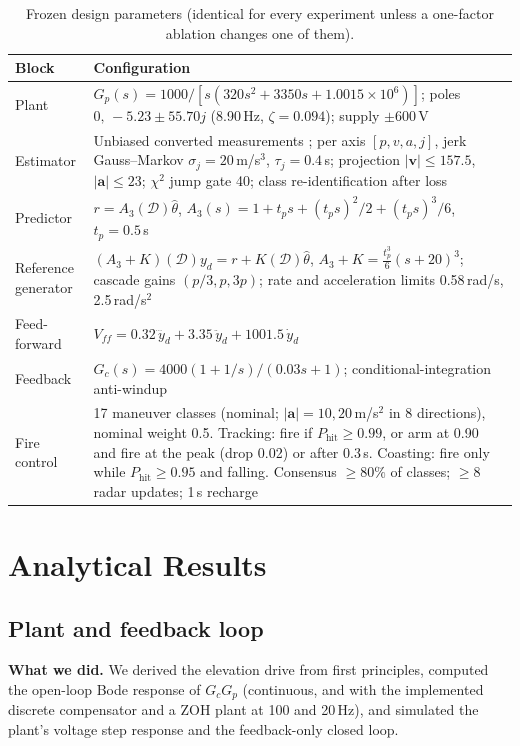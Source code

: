 \documentclass[11pt,a4paper]{article}
\newcommand{\Phit}{P_{\mathrm{hit}}}
\newcommand{\D}{\mathcal{D}}
\begin{document}
\begin{table}[H]
\centering\small
\caption{Frozen design parameters (identical for every experiment unless a one-factor ablation changes one of them).}
\label{tab:params}
\begin{tabularx}{\textwidth}{@{}lX@{}}
\toprule
Block & Configuration\\
\midrule
Plant & $G_p(s)=1000/[s(320s^2+3350s+1.0015\times10^6)]$; poles $0,\,-5.23\pm55.70j$ (8.90\,Hz, $\zeta=0.094$); supply $\pm600$\,V\\
Estimator & Unbiased converted measurements \cite{mo1998unbiased,lerro1993}; per axis $[p,v,a,j]$, jerk Gauss--Markov \cite{mehrotra1997jerk} $\sigma_j=20$\,m/s$^3$, $\tau_j=0.4$\,s; projection $|\mathbf v|\le157.5$, $|\mathbf a|\le23$; $\chi^2$ jump gate 40; class re-identification after loss\\
Predictor & $r=A_3(\D)\hat\theta$, $A_3(s)=1+t_ps+(t_ps)^2/2+(t_ps)^3/6$, $t_p=0.5$\,s\\
Reference generator & $(A_3+K)(\D)y_d=r+K(\D)\hat\theta$, $A_3+K=\tfrac{t_p^3}{6}(s+20)^3$; cascade gains $(p/3,p,3p)$; rate and acceleration limits 0.58\,rad/s, 2.5\,rad/s$^2$\\
Feed-forward & $V_{ff}=0.32\,\dddot y_d+3.35\,\ddot y_d+1001.5\,\dot y_d$\\
Feedback & $G_c(s)=4000(1+1/s)/(0.03s+1)$; conditional-integration anti-windup\\
Fire control & 17 maneuver classes (nominal; $|\mathbf a|=10, 20$\,m/s$^2$ in 8 directions), nominal weight 0.5. Tracking: fire if $\Phit\ge0.99$, or arm at 0.90 and fire at the peak (drop 0.02) or after 0.3\,s. Coasting: fire only while $\Phit\ge0.95$ and falling. Consensus $\ge80\%$ of classes; $\ge8$ radar updates; 1\,s recharge\\
\bottomrule
\end{tabularx}
\end{table}

\section{Analytical Results}

\subsection{Plant and feedback loop}
\textbf{What we did.} We derived the elevation drive from first principles, computed the open-loop Bode response of $G_cG_p$ (continuous, and with the implemented discrete compensator and a ZOH plant at 100 and 20\,Hz), and simulated the plant's voltage step response and the feedback-only closed loop.
\end{document}
